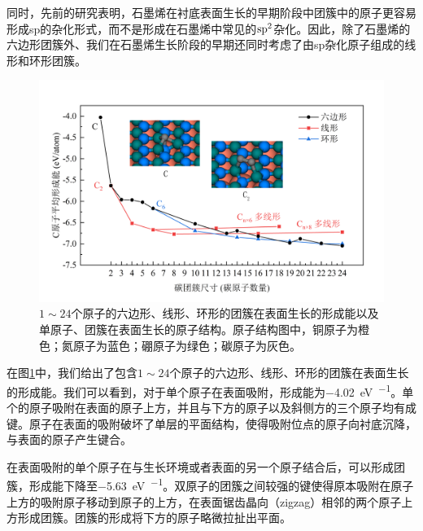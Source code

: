     同时，先前的研究表明，石墨烯在衬底表面生长的早期阶段中团簇中的原子更容易形成sp的杂化形式，而不是形成在石墨烯中常见的$\rm sp^2$杂化。因此，除了石墨烯的六边形团簇外、我们在石墨烯生长阶段的早期还同时考虑了由sp杂化原子组成的线形和环形团簇。


    \begin{figure}[htb]
        \includegraphics{pic/CG_DFT_C_cluster_onBN.png}
        \caption{$1 \sim 24$个原子的六边形、线形、环形的团簇在表面生长的形成能以及单原子、团簇在表面生长的原子结构。原子结构图中，铜原子为橙色；氮原子为蓝色；硼原子为绿色；碳原子为灰色。}
        \label{fig:CG_DFT_C_cluster_onBN}
    \end{figure}

    在图\ref{fig:CG_DFT_C_cluster_onBN}中，我们给出了包含$1 \sim 24$个原子的六边形、线形、环形的团簇在表面生长的形成能。我们可以看到，对于单个原子在表面吸附，形成能为\SI{-4.02}{\electronvolt\per\atom}。单个的原子吸附在表面的原子上方，并且与下方的原子以及斜侧方的三个原子均有成键。原子在表面的吸附破坏了单层的平面结构，使得吸附位点的原子向衬底沉降，与表面的原子产生键合。

    在表面吸附的单个原子在与生长环境或者表面的另一个原子结合后，可以形成团簇，形成能下降至\SI{-5.63}{\electronvolt\per\atom}。双原子的团簇之间较强的键使得原本吸附在原子上方的吸附原子移动到原子的上方，在表面锯齿晶向（zigzag）相邻的两个原子上方形成团簇。团簇的形成将下方的原子略微拉扯出平面。


